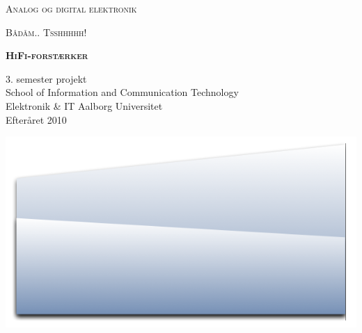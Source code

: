 \begin{center}
\textsc{\huge Analog og digital elektronik\\}
\vspace{5 mm}

\textsc{\Large Bådåm.. Tsshhhhh!\\}
\vspace{25 mm}

\textsc{\textbf{\HUGE HiFi-forstærker}}
\vspace{20 mm}

\begin{flushright}
3. semester projekt \\
School of Information and Communication Technology \\
Elektronik \& IT Aalborg Universitet \\
Efteråret 2010 \\
\end{flushright}

\includegraphics[width=1.0\textwidth]{forside/forside.png}

\end{center}